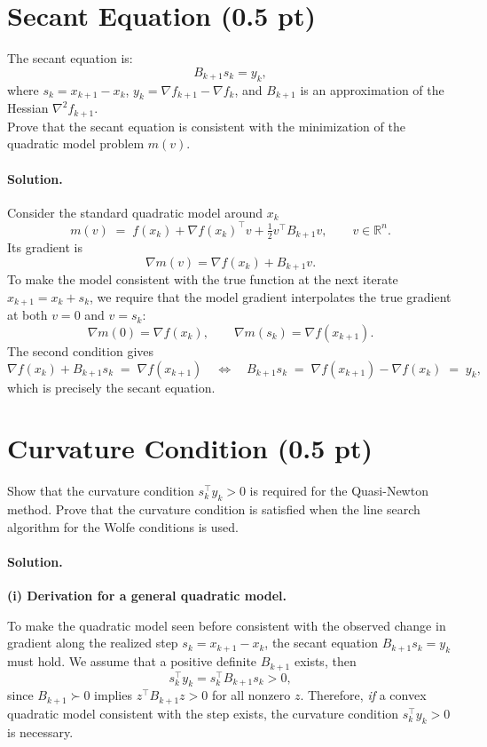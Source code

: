 \documentclass[11pt]{article}
\begin{document}
\section*{Secant Equation (0.5 pt)}

The secant equation is:
\[
B_{k+1}s_k = y_k,
\]
where \(s_k = x_{k+1}-x_k\), \(y_k=\nabla f_{k+1}-\nabla f_k\), and \(B_{k+1}\) is an approximation of the Hessian \(\nabla^2 f_{k+1}\).
\\
Prove that the secant equation is consistent with the minimization of the quadratic model problem \(m(v)\).

\paragraph{Solution.}
Consider the standard quadratic model around \(x_k\)
\[
m(v) \;=\; f(x_k) + \nabla f(x_k)^{\!\top} v + \tfrac12 v^{\!\top} B_{k+1} v ,
\qquad v\in\mathbb{R}^n.
\]
Its gradient is
\[
\nabla m(v)=\nabla f(x_k)+B_{k+1}v.
\]
To make the model consistent with the true function at the next iterate \(x_{k+1}=x_k+s_k\), we require that the model gradient interpolates the true gradient at both \(v=0\) and \(v=s_k\):
\[
\nabla m(0)=\nabla f(x_k), \qquad
\nabla m(s_k)=\nabla f(x_{k+1}).
\]
The second condition gives
\[
\nabla f(x_k) + B_{k+1} s_k \;=\; \nabla f(x_{k+1})
\quad\Longleftrightarrow\quad
B_{k+1}s_k \;=\; \nabla f(x_{k+1})-\nabla f(x_k) \;=\; y_k,
\]
which is precisely the secant equation.

\section*{Curvature Condition (0.5 pt)}

Show that the curvature condition \(s_k^{\top}y_k>0\) is required for the Quasi-Newton method.
Prove that the curvature condition is satisfied when the line search algorithm for the Wolfe conditions is used.

\paragraph{Solution.}
\textbf{(i) Derivation for a general quadratic model.}

To make the quadratic model seen before consistent with the observed change in gradient along the realized step \(s_k=x_{k+1}-x_k\), the secant equation
\(B_{k+1}s_k=y_k\) must hold.
We assume that a positive definite \(B_{k+1}\) exists, then
\[
s_k^{\top}y_k = s_k^{\top} B_{k+1} s_k > 0,
\]
since \(B_{k+1}\succ 0\) implies \(z^{\top}B_{k+1}z>0\) for all nonzero \(z\).
Therefore, \emph{if} a convex quadratic model consistent with the step exists, the curvature condition \(s_k^{\top}y_k>0\) is necessary. 
\end{document}
